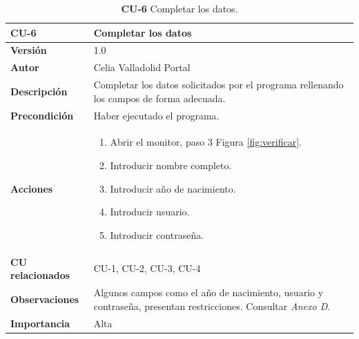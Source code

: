 \begin{table}[H]
	\centering
	\begin{tabularx}{\linewidth}{ p{} p{} }
		\toprule
            \rowcolor[HTML]{B0E0E6}
		\textbf{CU-6}    & \textbf{Completar los datos}\\
		\toprule
		\textbf{Versión}              & 1.0    \\
		\textbf{Autor}                & Celia Valladolid Portal \\
		\textbf{Descripción}          & Completar los datos solicitados por el programa rellenando los campos de forma adecuada.  \\
		\textbf{Precondición}         & Haber ejecutado el programa. \\
		\textbf{Acciones}             &
		\begin{enumerate}
			\def\labelenumi{\arabic{enumi}.}
			\tightlist
                \item Abrir el monitor, paso 3 Figura \ref{fig:verificar}.
			\item Introducir nombre completo.
			\item Introducir año de nacimiento.
                \item Introducir usuario.
                \item Introducir contraseña.
		\end{enumerate}\\
		\textbf{CU relacionados}        & CU-1, CU-2, CU-3, CU-4 \\
		\textbf{Observaciones}          & Algunos campos como el año de nacimiento, usuario y contraseña, presentan restricciones. Consultar \textit{Anexo D}. \\
		\textbf{Importancia}          & Alta  \\
		\bottomrule
	\end{tabularx}
	\caption{\textbf{CU-6} Completar los datos.}
        \label{tab:cu6}
\end{table}

